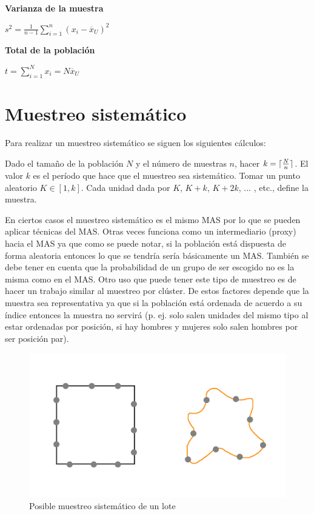 \documentclass{report}
\DeclarePairedDelimiter{\ceil}{\lceil}{\rceil}
\begin{document}
\bigbreak
\textbf{Varianza de la muestra}

\bigbreak

$s^2 = \frac{1}{n-1} \sum_{i=1}^n (x_i - \overline{x}_U)^2$


\bigbreak
\textbf{Total de la población}

\bigbreak

$t = \sum_{i=1}^N x_i = N \overline{x}_U$


\section{Muestreo sistemático}

Para realizar un muestreo sistemático se siguen los siguientes cálculos:

\bigbreak

Dado el tamaño de la población $N$ y el número de muestras $n$, hacer $k=\ceil{\frac{N}{n}}$. El valor $k$ es el período que hace que el muestreo sea sistemático. Tomar un punto aleatorio $K \in [1, k]$. Cada unidad dada por $K$, $K + k$, $K + 2k$, ... , etc., define la muestra.

\bigbreak

En ciertos casos el muestreo sistemático es el mismo MAS por lo que se pueden aplicar técnicas del MAS. Otras veces funciona como un intermediario (proxy) hacia el MAS ya que como se puede notar, si la población está dispuesta de forma aleatoria entonces lo que se tendría sería básicamente un MAS. También se debe tener en cuenta que la probabilidad de un grupo de ser escogido no es la misma como en el MAS. Otro uso que puede tener este tipo de muestreo es de hacer un trabajo similar al muestreo por clúster. De estos factores depende que la muestra sea representativa ya que si la población está ordenada de acuerdo a su índice entonces la muestra no servirá (p. ej. solo salen unidades del mismo tipo al estar ordenadas por posición, si hay hombres y mujeres solo salen hombres por ser posición par). 

\bigbreak

\begin{figure}[H]
    \centering
    \includegraphics[width=0.3\paperwidth]{img/soil-systematic-sampling.png}
    \caption{Posible muestreo sistemático de un lote}
\end{figure}
\end{document}
